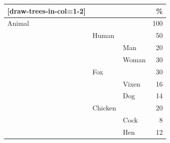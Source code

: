 \documentclass{article}
\begin{document}

\renewcommand{\arraystretch}{1.3}
%
\begin{NiceTabular}{w{l}{2.5mm} w{l}{2.5mm} l r}[draw-trees-in-col=1-2]
    \toprule
    \RowStyle{\bfseries}
     &&&  \% \\
    \midrule
    Animal   &&& 100 \\
    & Human   &&  50 \\
    && Man     &  20 \\
    && Woman   &  30 \\
    & Fox     &&  30 \\
    && Vixen   &  16 \\
    && Dog     &  14 \\
    & Chicken &&  20 \\
    && Cock    &   8 \\
    && Hen     &  12 \\
    \bottomrule
\end{NiceTabular}
\end{document}
